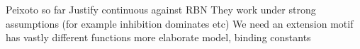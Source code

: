 \documentclass[../main.tex]{subfiles}
\begin{document}
Peixoto so far
Justify continuous against RBN
They work under strong assumptions (for example inhibition dominates etc) \cite{}
We need an extension
motif has vastly different functions \cite{ingram2006network}
more elaborate model, binding constants	\cite{ingram2006network}
\end{document}
